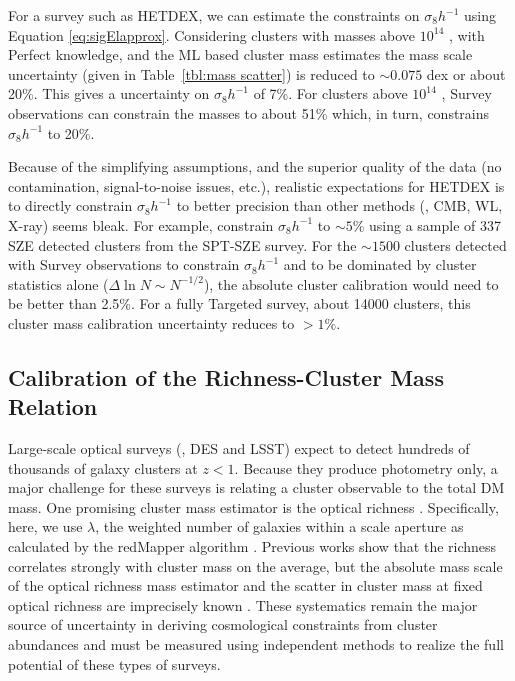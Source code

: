 \documentclass[fleqn,usenatbib]{mnras}
\begin{document}
For a survey such as HETDEX, we can estimate the constraints on $\sigma_8h^{-1}$ using Equation \ref{eq:sigElapprox}. Considering clusters with masses above $10^{14}$ \Msol, with Perfect knowledge, and the ML based cluster mass estimates the mass scale uncertainty (given in Table~\ref{tbl:mass scatter}) is reduced to $\sim 0.075$ dex or about 20\%. This gives a uncertainty on $\sigma_8h^{-1}$ of 7\%. For clusters above $10^{14}$ \Msol, Survey observations can constrain the masses to about 51\% which, in turn, constrains $\sigma_8h^{-1}$ to 20\%.

Because of the simplifying assumptions, and the superior quality of the data (no contamination, signal-to-noise issues, etc.), realistic expectations for HETDEX is to directly constrain $\sigma_8h^{-1}$ to better precision than other methods (\eg, CMB, WL, X-ray) seems bleak. For example, \cite{deHaan2016} constrain $\sigma_8h^{-1}$ to $\sim5$\% using a sample of 337 SZE detected clusters from the SPT-SZE survey. For the $\sim1500$ clusters detected with Survey observations to constrain $\sigma_8h^{-1}$ and to be dominated by cluster statistics alone ($\Delta \ln N \sim N^{-1/2}$), the absolute cluster calibration would need to be better than 2.5\%. For a fully Targeted survey, about 14000 clusters, this cluster mass calibration uncertainty reduces to $>1\%$.

\subsection{Calibration of the Richness-Cluster Mass Relation}
Large-scale optical surveys (\eg, DES and LSST) expect to detect hundreds of thousands of galaxy clusters at $z < 1$. Because they produce photometry only, a major challenge for these surveys is relating a cluster observable to the total DM mass. One promising cluster mass estimator is the optical richness . Specifically, here, we use $\lambda$, the weighted number of galaxies within a scale aperture  as calculated by the redMapper algorithm \citep{Rykoff2012}. Previous works  show that the richness correlates strongly with cluster mass on the average, but the absolute mass scale of the optical richness mass estimator and the scatter in cluster mass at fixed optical richness are imprecisely known \citep{Rykoff2012}. These systematics remain the major source of uncertainty in deriving cosmological constraints from cluster abundances and must be measured using independent methods to realize the full potential of these types of surveys.
\end{document}
